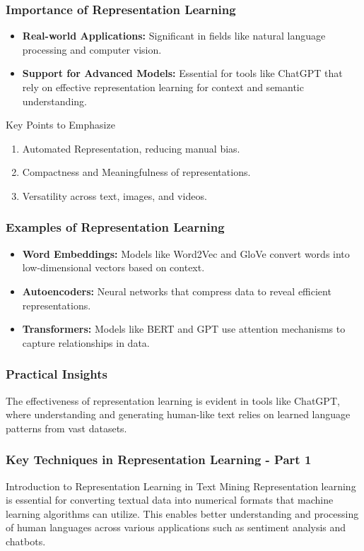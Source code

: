 \documentclass[aspectratio=169]{beamer}
\begin{document}
\begin{frame}[fragile]
    \frametitle{Importance of Representation Learning}
    \begin{itemize}
        \item \textbf{Real-world Applications:} Significant in fields like natural language processing and computer vision.
        \item \textbf{Support for Advanced Models:} Essential for tools like ChatGPT that rely on effective representation learning for context and semantic understanding.
    \end{itemize}
    \begin{block}{Key Points to Emphasize}
        \begin{enumerate}
            \item Automated Representation, reducing manual bias.
            \item Compactness and Meaningfulness of representations.
            \item Versatility across text, images, and videos.
        \end{enumerate}
    \end{block}
\end{frame}

\begin{frame}[fragile]
    \frametitle{Examples of Representation Learning}
    \begin{itemize}
        \item \textbf{Word Embeddings:} Models like Word2Vec and GloVe convert words into low-dimensional vectors based on context.
        \item \textbf{Autoencoders:} Neural networks that compress data to reveal efficient representations.
        \item \textbf{Transformers:} Models like BERT and GPT use attention mechanisms to capture relationships in data.
    \end{itemize}
\end{frame}

\begin{frame}[fragile]
    \frametitle{Practical Insights}
    The effectiveness of representation learning is evident in tools like ChatGPT, where understanding and generating human-like text relies on learned language patterns from vast datasets.
\end{frame}

\begin{frame}[fragile]
    \frametitle{Key Techniques in Representation Learning - Part 1}
    \begin{block}{Introduction to Representation Learning in Text Mining}
        Representation learning is essential for converting textual data into numerical formats that machine learning algorithms can utilize. This enables better understanding and processing of human languages across various applications such as sentiment analysis and chatbots.
    \end{block}
\end{frame}
\end{document}
